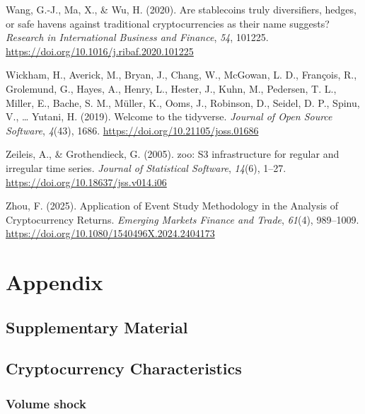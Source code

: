 \documentclass[
  12pt,
  a4paper,
  openany]{scrbook}
\newlength{\cslhangindent}
\newenvironment{CSLReferences}[2] %
 {\begin{list}{}{%
  \setlength{\itemindent}{0pt}
  \setlength{\leftmargin}{0pt}
  \setlength{\parsep}{0pt}
  \ifodd #1
   \setlength{\leftmargin}{\cslhangindent}
   \setlength{\itemindent}{-1\cslhangindent}
  \fi
  \setlength{\itemsep}{#2\baselineskip}}}
 {\end{list}}
\begin{document}
\begin{CSLReferences}{1}{0}
Wang, G.-J., Ma, X., \& Wu, H. (2020). Are stablecoins truly
diversifiers, hedges, or safe havens against traditional
cryptocurrencies as their name suggests? \emph{Research in International
Business and Finance}, \emph{54}, 101225.
\url{https://doi.org/10.1016/j.ribaf.2020.101225}

Wickham, H., Averick, M., Bryan, J., Chang, W., McGowan, L. D.,
François, R., Grolemund, G., Hayes, A., Henry, L., Hester, J., Kuhn, M.,
Pedersen, T. L., Miller, E., Bache, S. M., Müller, K., Ooms, J.,
Robinson, D., Seidel, D. P., Spinu, V., \ldots{} Yutani, H. (2019).
Welcome to the {tidyverse}. \emph{Journal of Open Source Software},
\emph{4}(43), 1686. \url{https://doi.org/10.21105/joss.01686}

Zeileis, A., \& Grothendieck, G. (2005). {zoo}: S3 infrastructure for
regular and irregular time series. \emph{Journal of Statistical
Software}, \emph{14}(6), 1--27.
\url{https://doi.org/10.18637/jss.v014.i06}

Zhou, F. (2025). Application of Event Study Methodology in the Analysis
of Cryptocurrency Returns. \emph{Emerging Markets Finance and Trade},
\emph{61}(4), 989--1009.
\url{https://doi.org/10.1080/1540496X.2024.2404173}

\end{CSLReferences}

\cleardoublepage
{}
{}
\appendix

\chapter{Appendix}\label{appendix}

\section{Supplementary Material}\label{sec-app_material}

\section{Cryptocurrency Characteristics}\label{sec-app_characteristics}

\subsection{Volume shock}\label{volume-shock}
\end{document}
